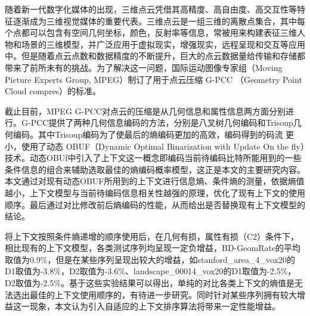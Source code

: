 
\begin{cabstract}
    随着新一代数字化媒体的出现，三维点云凭借其高精度、高自由度、高交互性等特征逐渐成为三维视觉媒体的重要代表。三维点云是一组三维的离散点集合，其中每个点都可以包含有空间几何坐标，颜色，反射率等信息，常被用来构建表征三维人物和场景的三维模型，并广泛应用于虚拟现实，增强现实，远程呈现和交互等应用中。但是随着点云点数和数据精度的不断提升，巨大的点云数据量给传输和存储都带来了前所未有的挑战。为了解决这一问题，国际运动图像专家组（Moving Picture Experts Group, MPEG）制订了用于点云压缩 G-PCC （Geometry Point Cloud compres）的标准。

    截止目前，MPEG G-PCC对点云的压缩是从几何信息和属性信息两方面分别进行。G-PCC提供了两种几何信息编码的方法，分别是八叉树几何编码和Trisoup几何编码。其中Trisoup编码为了使最后的熵编码更加的高效，编码得到的码流 更小，使用了动态 OBUF（Dynamic Optimal Binarization with Update On the fly）技术。动态OBUf中引入了上下文这一概念即编码当前待编码比特所能用到的一些条件信息的组合来辅助选取最佳的熵编码概率模型，这正是本文的主要研究内容。本文通过对现有动态OBUF所用到的上下文进行信息熵、条件熵的测量，依据熵值越小，上下文模型与当前待编码信息相关性越强的原理，优化了现有上下文的使用顺序。最后通过对比修改前后熵编码的性能，从而给出是否替换现有上下文模型的结论。

    将上下文按照条件熵递增的顺序使用后，在几何有损，属性有损（C2）条件下，相比现有的上下文模型，各类测试序列均呈现一定负增益，BD-GeomRate的平均取值为0.9\%，但是在某些序列呈现出较大的增益，如stanford\_area\_4\_vox20的D1取值为-3.8\%，D2取值为-3.6\%、landscape\_00014\_vox20的D1取值为-2.5\%，D2取值为-2.5\%。基于这些实验结果可以得出，单纯的对比各类上下文的熵值是无法选出最佳的上下文使用顺序的，有待进一步研究。同时针对某些序列拥有较大增益这一现象，本文认为引入自适应的上下文排序算法将带来一定性能增益。



\end{cabstract}

